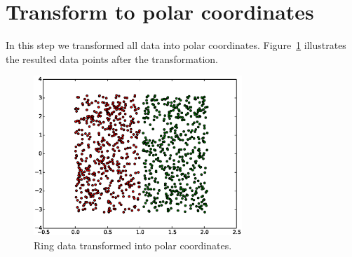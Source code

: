 \documentclass[a4paper,10pt]{article}
\begin{document}
\section{Transform to polar coordinates}
In this step we transformed all data into polar coordinates. Figure~\ref{fig:polarData} illustrates the resulted data points after the transformation.
\begin{figure}[ht!]
    \centering
    \includegraphics[width=0.70\textwidth]{polarData.eps}
    \caption{Ring data transformed into polar coordinates.}
    \label{fig:polarData}
\end{figure}
\end{document}
